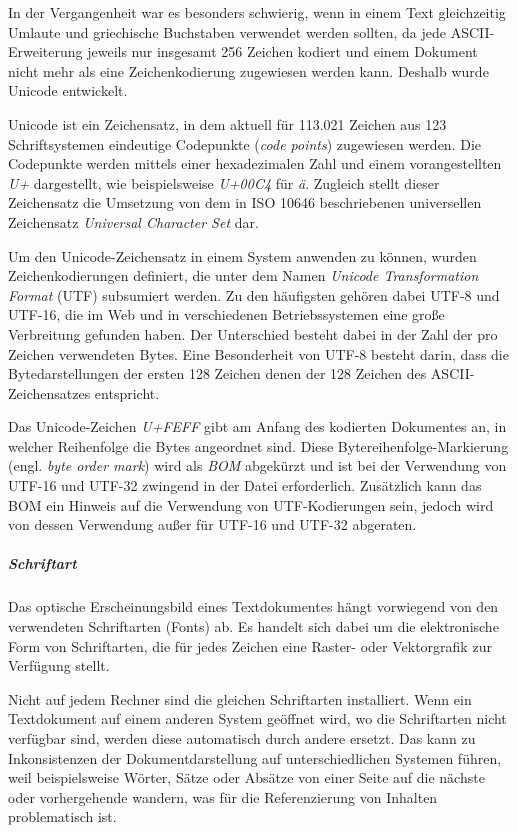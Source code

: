 In der Vergangenheit war es besonders schwierig, wenn in einem Text gleichzeitig Umlaute und griechische Buchstaben verwendet werden sollten, da jede ASCII-Erweiterung jeweils nur insgesamt 256 Zeichen kodiert und einem Dokument nicht mehr als eine Zeichenkodierung zugewiesen werden kann. Deshalb wurde Unicode entwickelt.

Unicode ist ein Zeichensatz, in dem aktuell für 113.021 Zeichen aus 123 Schriftsystemen eindeutige Codepunkte (\emph{code points}) zugewiesen werden. Die Codepunkte werden mittels einer hexadezimalen Zahl und einem vorangestellten \emph{U+} dargestellt, wie beispielsweise \emph{U+00C4} für \emph{ä}. Zugleich stellt dieser Zeichensatz die Umsetzung von dem in ISO 10646 beschriebenen universellen Zeichensatz \emph{Universal Character Set} dar.

Um den Unicode-Zeichensatz in einem System anwenden zu können, wurden Zeichenkodierungen definiert, die unter dem Namen \emph{Unicode Transformation Format} (UTF) subsumiert werden. Zu den häufigsten gehören dabei UTF-8 und UTF-16, die im Web und in verschiedenen Betriebssystemen eine große Verbreitung gefunden haben. Der Unterschied besteht dabei in der Zahl der pro Zeichen verwendeten Bytes. Eine Besonderheit von UTF-8 besteht darin, dass die Bytedarstellungen der ersten 128 Zeichen denen der 128 Zeichen des ASCII-Zeichensatzes entspricht.

Das Unicode-Zeichen \emph{U+FEFF} gibt am Anfang des kodierten Dokumentes an, in welcher Reihenfolge die Bytes angeordnet sind. Diese Bytereihenfolge-Markierung (engl. \emph{byte order mark}) wird als \emph{BOM} abgekürzt und ist bei der Verwendung von UTF-16 und UTF-32 zwingend in der Datei erforderlich. Zusätzlich kann das BOM ein Hinweis auf die Verwendung von UTF-Kodierungen sein, jedoch wird von dessen Verwendung außer für UTF-16 und UTF-32 abgeraten.


\subparagraph{Schriftart}
Das optische Erscheinungsbild eines Textdokumentes hängt vorwiegend von den verwendeten Schriftarten (Fonts) ab. Es handelt sich dabei um die elektronische Form von Schriftarten, die für jedes Zeichen eine Raster- oder Vektorgrafik zur Verfügung stellt. 

Nicht auf jedem Rechner sind die gleichen Schriftarten installiert. Wenn ein Textdokument auf einem anderen System geöffnet wird, wo die Schriftarten nicht verfügbar sind, werden diese automatisch durch andere ersetzt. Das kann zu Inkonsistenzen der Dokumentdarstellung auf unterschiedlichen Systemen führen, weil beispielsweise Wörter, Sätze oder Absätze von einer Seite auf die nächste oder vorhergehende wandern, was für die Referenzierung von Inhalten problematisch ist.  

